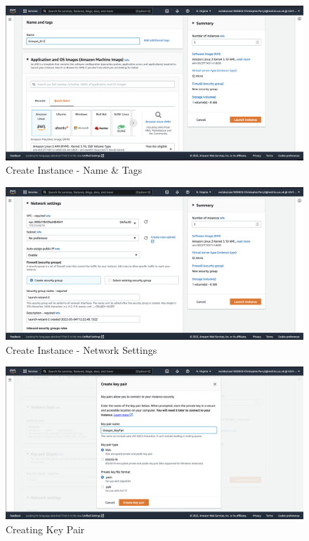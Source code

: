 \begin{figure}[H]
    \centering
        \includegraphics[width=\textwidth]{resources/ec2/create-instance-name-and-tags}
    \caption{Create Instance - Name \& Tags}
    \label{fig:create-instance-name-and-tags}
\end{figure}

\begin{figure}[H]
    \centering
        \includegraphics[width=\textwidth]{resources/ec2/create-instance-network-settings}
    \caption{Create Instance - Network Settings}
    \label{fig:create-instance-network-settings}
\end{figure}

\begin{figure}[H]
    \centering
        \includegraphics[width=\textwidth]{resources/create-key-pair.png}
    \caption{Creating Key Pair}
    \label{fig:create-key-pair}
\end{figure}

